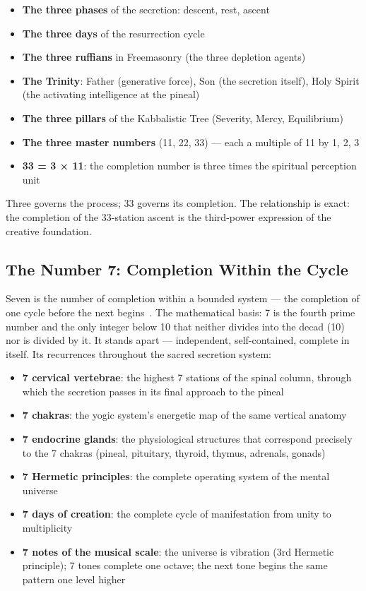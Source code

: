 \documentclass[12pt, a4paper]{article}
\begin{document}
\begin{itemize}[leftmargin=1.5cm]
  \item \textbf{The three phases} of the secretion: descent, rest, ascent
  \item \textbf{The three days} of the resurrection cycle
  \item \textbf{The three ruffians} in Freemasonry (the three depletion agents)
  \item \textbf{The Trinity}: Father (generative force), Son (the secretion itself),
  Holy Spirit (the activating intelligence at the pineal)
  \item \textbf{The three pillars} of the Kabbalistic Tree (Severity, Mercy, Equilibrium)
  \item \textbf{The three master numbers} (11, 22, 33) — each a multiple of 11 by 1, 2, 3
  \item \textbf{33 = 3 × 11}: the completion number is three times the spiritual
  perception unit
\end{itemize}

Three governs the process; 33 governs its completion. The relationship is exact:
the completion of the 33-station ascent is the third-power expression of the
creative foundation.

\subsection{The Number 7: Completion Within the Cycle}

Seven is the number of completion within a bounded system — the completion of
one cycle before the next begins~\autocite{westcott1911}. The mathematical
basis: 7 is the fourth prime number and the only integer below 10 that neither
divides into the decad (10) nor is divided by it. It stands apart — independent,
self-contained, complete in itself. Its recurrences throughout the sacred
secretion system:

\begin{itemize}[leftmargin=1.5cm]
  \item \textbf{7 cervical vertebrae}: the highest 7 stations of the spinal
  column, through which the secretion passes in its final approach to the pineal
  \item \textbf{7 chakras}: the yogic system's energetic map of the same vertical
  anatomy
  \item \textbf{7 endocrine glands}: the physiological structures that correspond
  precisely to the 7 chakras (pineal, pituitary, thyroid, thymus, adrenals, gonads)
  \item \textbf{7 Hermetic principles}: the complete operating system of the mental
  universe
  \item \textbf{7 days of creation}: the complete cycle of manifestation from unity
  to multiplicity
  \item \textbf{7 notes of the musical scale}: the universe is vibration (3rd
  Hermetic principle); 7 tones complete one octave; the next tone begins the same
  pattern one level higher
\end{itemize}
\end{document}
